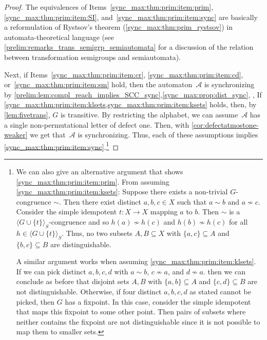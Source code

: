 \begin{proof}  	
The equivalences of Items~\ref{sync_max:thm:prim:item:prim}, \ref{sync_max:thm:prim:item:SI}, and~\ref{sync_max:thm:prim:item:sync}
are basically a reformulation of Rystsov's theorem (\cref{sync_max:thm:prim_rystsov})
in automata-theoretical language (see \cref{prelim:remarks_trans_semigrp_semiautomata}
for a discussion of the relation between transformation semigroups and semiautomata).

Next, if Items~\ref{sync_max:thm:prim:item:cr}, \ref{sync_max:thm:prim:item:cd}, or~\ref{sync_max:thm:prim:item:sm} hold,
then the automaton~$\mathcal A$ is synchronizing
by \cref{prelim:lem:compl_reach_implies_SCC_sync},\cref{sync_max:prop:dist_sync}, ,
If \cref{sync_max:thm:prim:item:klsets,sync_max:thm:prim:item:ksets} holds,
then, by \cref{lem:fivetrans}, $G$ is transitive.
By restricting the alphabet, we can assume~$\mathcal A$ has a single non-permutational letter
of defect one. Then, with \cref{cor:defectatmostone-weaker} 
we get that~$\mathcal A$ is synchronizing. Thus, each of these assumptions
implies \cref{sync_max:thm:prim:item:sync}.\footnote{We can also give 
	an alternative argument that shows \cref{sync_max:thm:prim:item:prim}.
From assuming \cref{sync_max:thm:prim:item:ksets}: 
Suppose there exists a non-trivial $G$-congruence $\sim$.
Then there exist distinct $a,b,c \in X$
such that $a \sim b$
and $a \not\sim c$.
Consider the simple idempotent $t \colon X \to X$
mapping $a$ to $b$.
Then $\sim$ is a $\langle G \cup \{t\} \rangle_S$-congruence
and so $h(a) \not\sim h(c)$
and $h(b) \not\sim h(c)$ for all $h \in \langle G \cup \{t\} \rangle_S$.
Thus, no two subsets $A,B \subseteq X$
with $\{a,c\} \subseteq A$ and $\{b,c\} \subseteq B$
are distinguishable. 

A similar argument works when assuming \cref{sync_max:thm:prim:item:klsets}.
If we can pick distinct $a,b,c,d$
with $a \sim b$, $c \not\sim a$, and $d \not\sim a$.
then we can conclude as before that disjoint sets $A,B$
with $\{a,b\}\subseteq A$ and $\{c,d\} \subseteq B$ are not distinguishable.
Otherwise, if four distinct $a,b,c,d$ as stated cannot be picked, then $G$ has a fixpoint.
In this case, consider the simple idempotent that maps this fixpoint
to some other point. Then pairs of subsets where neither contains
the fixpoint are not distinguishable since it is not possible
to map them to smaller sets.}


\end{proof}
